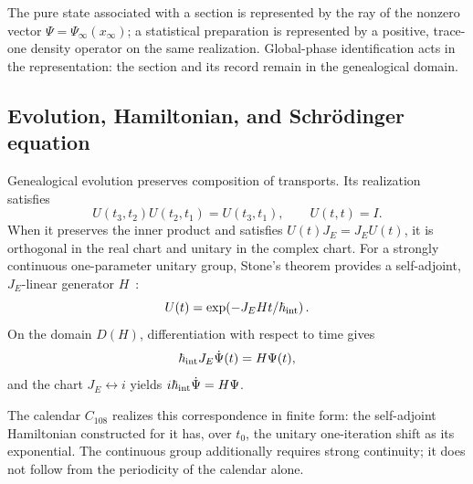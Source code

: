 \begin{principle}
\label{v:rec:realizacion_evolucion:statement:02}
The pure state associated with a section is represented by the ray of the
nonzero vector \(\Psi=\Psi_\infty(x_\infty)\); a statistical preparation is
represented by a positive, trace-one density operator on the same
realization. Global-phase identification acts in the representation:
the section and its record remain in the genealogical domain.
\end{principle}

\subsection{Evolution, Hamiltonian, and Schrödinger equation}
\label{v:rec:realizacion_evolucion:section:03}

Genealogical evolution preserves composition of transports. Its
realization satisfies
\[
 U(t_3,t_2)U(t_2,t_1)=U(t_3,t_1),
 \qquad U(t,t)=I.
\]
When it preserves the inner product and satisfies
\(U(t)J_E=J_EU(t)\), it is orthogonal in the real chart and unitary in the
complex chart. For a strongly continuous one-parameter unitary group,
Stone's theorem provides a self-adjoint, \(J_E\)-linear generator
\(H\)~\cite{Stone1932}:
\[
 U(t)=\exp\!\left(-J_E H t/\hbar_{\rm int}\right).
\]
On the domain \(D(H)\), differentiation with respect to time gives
\begin{equation}
 \hbar_{\rm int}J_E\dot\Psi(t)=H\Psi(t),
 \label{v:rec:eq:schrodinger-genealogico-rev2}
\end{equation}
and the chart \(J_E\leftrightarrow i\) yields
\(i\hbar_{\rm int}\dot\Psi=H\Psi\).

The calendar \(C_{108}\) realizes this correspondence in finite form:
the self-adjoint Hamiltonian constructed for it has, over \(t_0\),
the unitary one-iteration shift as its exponential. The
continuous group additionally requires strong continuity; it does not follow
from the periodicity of the calendar alone.
